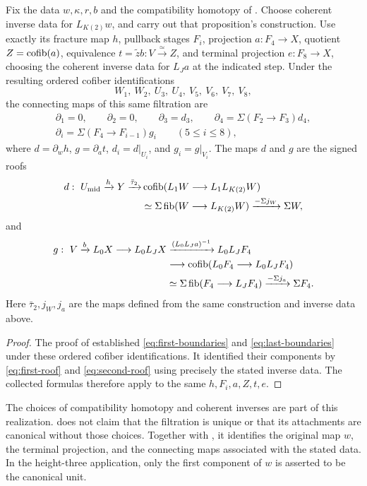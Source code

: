 \begin{theorem}
\label{thm:attachment-identification}
Fix the data \(w,\kappa,r,b\) and the compatibility homotopy of
.  Choose coherent inverse data for
\(L_{K(2)}w\), and carry out that proposition's construction.
Use exactly its fracture map \(h\), pullback stages \(F_i\),
projection \(a:F_4\to X\), quotient \(Z=\operatorname{cofib}(a)\),
equivalence \(t=\widetilde z b:V\xrightarrow{\simeq}Z\), and
terminal projection \(e:F_8\to X\), choosing the coherent inverse
data for \(L_Ja\) at the indicated step.  Under the resulting
ordered cofiber identifications
\[
 W_1,\ W_2,\ U_3,\ U_4,\ V_5,\ V_6,\ V_7,\ V_8,
\]
the connecting maps of this same filtration are
\[
\begin{gathered}
 \partial_1=0,\qquad \partial_2=0,\qquad
 \partial_3=d_3,\qquad
 \partial_4=\Sigma(F_2\to F_3)d_4,\\
 \partial_i=\Sigma(F_4\to F_{i-1})g_i
 \qquad(5\leq i\leq8),
\end{gathered}
\]
where \(d=\partial_wh\), \(g=\partial_at\),
\(d_i=d|_{U_i}\), and \(g_i=g|_{V_i}\).  The maps \(d\) and \(g\)
are the signed roofs
\[
\begin{aligned}
 d:\ U_{\mathrm{mid}}\xrightarrow hY\xrightarrow{\bar\tau_2}
 &\operatorname{cofib}(L_1W\longrightarrow L_1L_{K(2)}W)\\
 &\simeq\Sigma\operatorname{fib}(W\longrightarrow L_{K(2)}W)
   \xrightarrow{-\Sigma j_W}\Sigma W,
\end{aligned}
\]
and
\[
\begin{aligned}
 g:\ V\xrightarrow bL_0X\longrightarrow L_0L_JX
 &\xrightarrow{(L_0L_Ja)^{-1}}L_0L_JF_4\\
 &\longrightarrow\operatorname{cofib}(L_0F_4\longrightarrow L_0L_JF_4)\\
 &\simeq\Sigma\operatorname{fib}(F_4\longrightarrow L_JF_4)
   \xrightarrow{-\Sigma j_a}\Sigma F_4.
\end{aligned}
\]
Here \(\bar\tau_2,j_W,j_a\) are the maps defined from the same
construction and inverse data above.
\end{theorem}

\begin{proof}
The proof of  established
\eqref{eq:first-boundaries} and \eqref{eq:last-boundaries} under
these ordered cofiber identifications.  It identified their
components by \eqref{eq:first-roof} and \eqref{eq:second-roof}
using precisely the stated inverse data.  The collected formulas
therefore apply to the same \(h,F_i,a,Z,t,e\).
\end{proof}

\begin{remark}
The choices of compatibility homotopy and coherent inverses are
part of this realization.  
does not claim that the
filtration is unique or that its attachments are canonical without
those choices.  Together with , it identifies the
original map \(w\), the terminal projection, and the connecting maps
associated with the stated data.
In the height-three application, only the first component of \(w\)
is asserted to be the canonical unit.
\end{remark}
